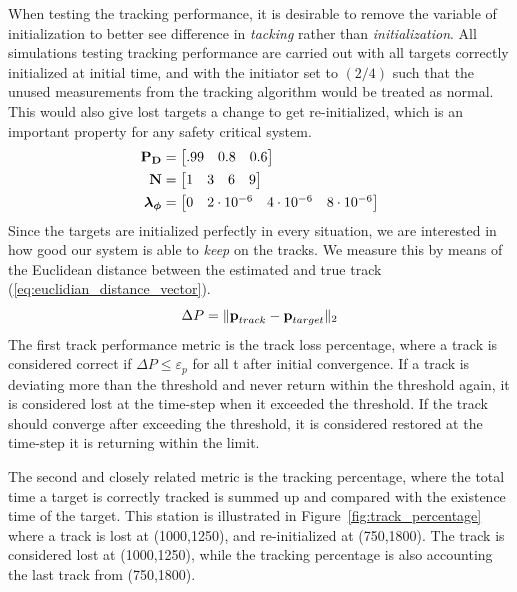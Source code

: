 When testing the tracking performance, it is desirable to remove the variable of initialization to better see difference in \emph{tacking} rather than \emph{initialization}. All simulations testing tracking performance are carried out with all targets correctly initialized at initial time, and with the initiator set to \( (2/4) \) such that the unused measurements from the tracking algorithm would be treated as normal. This would also give lost targets a change to get re-initialized, which is an important property for any safety critical system.
\begin{equation}\label{eq:tracking_test_table}
\begin{split}
\boldsymbol{\mathbf{P_D}} &= \begin{bmatrix} .99 & 0.8 & 0.6 \end{bmatrix} \\
\boldsymbol{\mathbf{N}} &= \begin{bmatrix} 1 & 3 & 6 & 9 \end{bmatrix} \\
\boldsymbol{\mathbf{\lambda_\phi}} &= \begin{bmatrix} 0 & 2\cdot10^{-6} & 4\cdot10^{-6} & 8\cdot10^{-6} \end{bmatrix}
\end{split}
\end{equation}
Since the targets are initialized perfectly in every situation, we are interested in how good our system is able to \emph{keep} on the tracks. We measure this by means of the Euclidean distance between the estimated and true track (\ref{eq:euclidian_distance_vector}).
\begin{equation}
	\Delta P = \| \boldsymbol{\mathbf{p}}_{track}-\boldsymbol{\mathbf{p}}_{target} \|_2
\label{eq:euclidian_distance_vector}
\end{equation}
The first track performance metric is the track loss percentage, where a track is considered correct if \(\Delta P \leq \varepsilon_p\) for all t after initial convergence. If a track is deviating more than the threshold and never return within the threshold again, it is considered lost at the time-step when it exceeded the threshold. If the track should converge after exceeding the threshold, it is considered restored at the time-step it is returning within the limit. 

The second and closely related metric is the tracking percentage, where the total time a target is correctly tracked is summed up and compared with the existence time of the target. This station is illustrated in Figure~\ref{fig:track_percentage} where a track is lost at (1000,1250), and re-initialized at (750,1800). The track is considered lost at (1000,1250), while the tracking percentage is also accounting the last track from (750,1800). 

